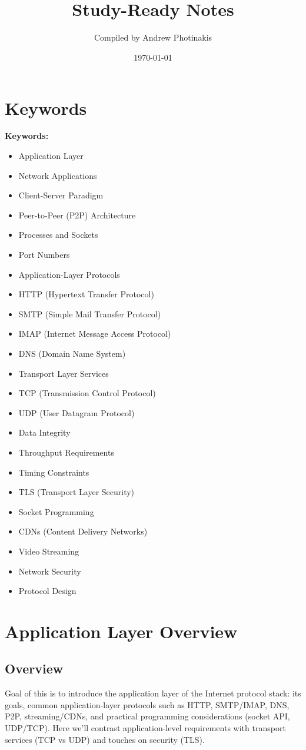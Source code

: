 \documentclass[12pt]{article}
\title{\TOPICTITLE\\\large Study-Ready Notes}
\author{Compiled by Andrew Photinakis}
\date{\today}
\begin{document}
\maketitle
\tableofcontents
\newpage

\section*{Keywords}
\noindent\textbf{Keywords:}
\begin{itemize}
    \item Application Layer
    \item Network Applications
    \item Client-Server Paradigm
    \item Peer-to-Peer (P2P) Architecture
    \item Processes and Sockets
    \item Port Numbers
    \item Application-Layer Protocols
    \item HTTP (Hypertext Transfer Protocol)
    \item SMTP (Simple Mail Transfer Protocol)
    \item IMAP (Internet Message Access Protocol)
    \item DNS (Domain Name System)
    \item Transport Layer Services
    \item TCP (Transmission Control Protocol)
    \item UDP (User Datagram Protocol)
    \item Data Integrity
    \item Throughput Requirements
    \item Timing Constraints
    \item TLS (Transport Layer Security)
    \item Socket Programming
    \item CDNs (Content Delivery Networks)
    \item Video Streaming
    \item Network Security
    \item Protocol Design
\end{itemize}

\section{Application Layer Overview}

\subsection{Overview}
Goal of this is to introduce the application layer of the Internet protocol stack: its goals, common application-layer protocols such as HTTP, SMTP/IMAP, DNS, P2P, streaming/CDNs, and practical programming considerations (socket API, UDP/TCP).
Here we'll contrast application-level requirements with transport services (TCP vs UDP) and touches on security (TLS).
\end{document}

